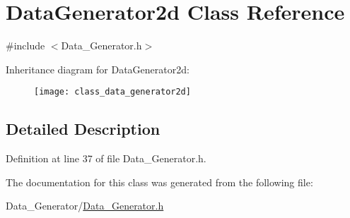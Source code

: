 \hypertarget{class_data_generator2d}{}\section{Data\+Generator2d Class Reference}
\label{class_data_generator2d}


{\ttfamily \#include $<$Data\+\_\+\+Generator.\+h$>$}

Inheritance diagram for Data\+Generator2d\+:\begin{figure}[H]
\begin{center}
\leavevmode
\texttt{[image: class\_data\_generator2d]}
\end{center}
\end{figure}


\subsection{Detailed Description}


Definition at line 37 of file Data\+\_\+\+Generator.\+h.



The documentation for this class was generated from the following file\+:\begin{DoxyCompactItemize}
\item 
Data\+\_\+\+Generator/\hyperlink{_data___generator_8h}{Data\+\_\+\+Generator.\+h}\end{DoxyCompactItemize}
